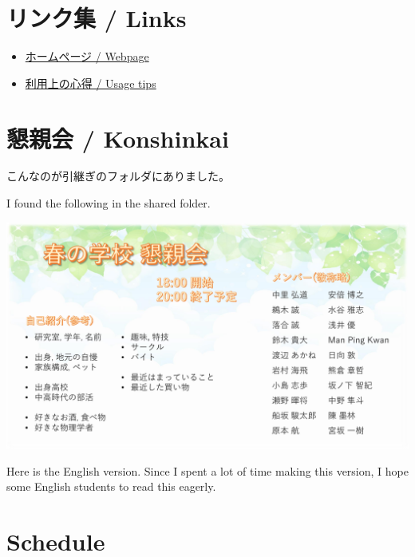 \documentclass[unicode,a4paper,11pt]{ltjsarticle}
\begin{document}
\section{リンク集 / Links}

\begin{itemize}
      \item
            \href{https://www.waseda.jp/inst/student/facility/seminar/facility/izukawana}{ホームページ / Webpage}
      \item
            \href{https://www.waseda.jp/inst/student/facility/seminar/flow/tips}{利用上の心得 / Usage tips}
\end{itemize}


\section{懇親会 / Konshinkai}

こんなのが引継ぎのフォルダにありました。

I found the following in the shared folder.

\begin{center}
      \includegraphics[width=1.0\linewidth]{konshinkai.pdf}
\end{center}


\clearpage

\setcounter{section}{0}

Here is the English version. Since I spent a lot of time making this version, I hope some English students to read this eagerly.

\label{eng_page}

\section{Schedule}
\end{document}
